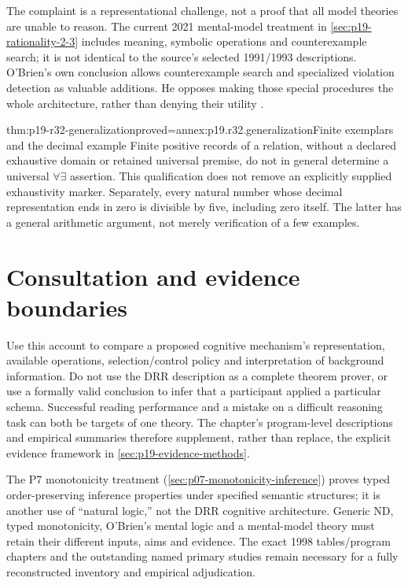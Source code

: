 The complaint is a representational challenge, not a proof that all model
theories are unable to reason. The current 2021 mental-model treatment in
\cref{sec:p19-rationality-2-3} includes meaning, symbolic operations and
counterexample search; it is not identical to the source's selected
1991/1993 descriptions. O'Brien's own conclusion allows counterexample
search and specialized violation detection as valuable additions. He
opposes making those special procedures the whole architecture, rather
than denying their utility \cite[pp.~222--223]{OBrien2021NaturalLogic}.

\begin{hbtheorem}{thm:p19-r32-generalization}{proved=annex:p19.r32.generalization}{Finite exemplars and the decimal example}
Finite positive records of a relation, without a declared exhaustive
domain or retained universal premise, do not in general determine a
universal \(\forall\exists\) assertion. This qualification does not
remove an explicitly supplied exhaustivity marker.
Separately, every natural number whose decimal representation ends in
zero is divisible by five, including zero itself. The latter has a
general arithmetic argument, not merely verification of a few examples.
\end{hbtheorem}

\section{Consultation and evidence boundaries}

Use this account to compare a proposed cognitive mechanism's
representation, available operations, selection/control policy and
interpretation of background information. Do not use the DRR description
as a complete theorem prover, or use a formally valid conclusion to infer
that a participant applied a particular schema. Successful reading
performance and a mistake on a difficult reasoning task can both be
targets of one theory. The chapter's program-level descriptions and
empirical summaries therefore supplement, rather than replace, the
explicit evidence framework in \cref{sec:p19-evidence-methods}.

The P7 monotonicity treatment
(\cref{sec:p07-monotonicity-inference}) proves typed order-preserving
inference properties under specified semantic structures; it is another
use of ``natural logic,'' not the DRR cognitive architecture. Generic
ND, typed monotonicity, O'Brien's mental logic and a mental-model theory
must retain their different inputs, aims and evidence. The exact 1998
tables/program chapters and the outstanding named primary studies remain
necessary for a fully reconstructed inventory and empirical adjudication.
